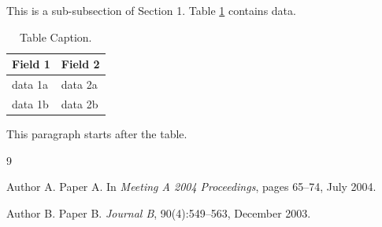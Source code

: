 \documentclass{mics}
\begin{document}
    This is a sub-subsection of Section 1. Table \ref{tab:data} contains data.

    \begin{table}[h]
        \centering
        \begin{tabular}{ll}
            \hline
            Field 1 & Field 2 \\
            \hline
            data 1a & data 2a \\
            data 1b & data 2b \\
            \hline
        \end{tabular}
        \caption{Table Caption.}
        \label{tab:data}
    \end{table}

    This paragraph starts after the table.

    \begin{thebibliography}{9}

        Author A.
        Paper A.
        In \emph{Meeting A 2004 Proceedings}, pages 65--74, July 2004.

        Author B.
        Paper B.
        \emph{Journal B}, 90(4):549--563, December 2003.

    \end{thebibliography}
\end{document}
